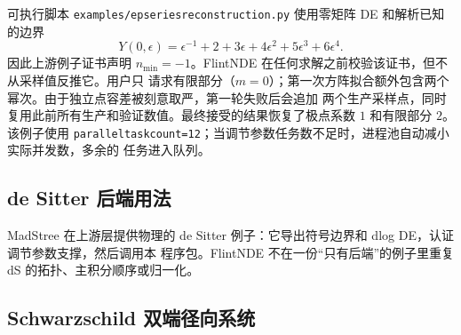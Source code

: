 \documentclass[11pt,a4paper]{ctexart}
\renewcommand{\_}{\origunderscore\allowbreak}
\begin{document}
可执行脚本 \texttt{examples/ep\_series\_reconstruction.py} 使用零矩阵 DE 和解析已知的边界
\begin{equation}
 Y(0,\epsilon)=\epsilon^{-1}+2+3\epsilon+4\epsilon^2+5\epsilon^3+6\epsilon^4.
\end{equation}
因此上游例子证书声明 $n_{\min}=-1$。FlintNDE 在任何求解之前校验该证书，但不从采样值反推它。用户只
请求有限部分（$m=0$）；第一次方阵拟合额外包含两个幂次。由于独立点容差被刻意取严，第一轮失败后会追加
两个生产采样点，同时复用此前所有生产和验证数值。最终接受的结果恢复了极点系数 $1$ 和有限部分 $2$。
该例子使用 \texttt{parallel\_task\_count=12}；当调节参数任务数不足时，进程池自动减小实际并发数，多余的
任务进入队列。

\subsection{de Sitter 后端用法}

MadStree 在上游层提供物理的 de Sitter 例子：它导出符号边界和 dlog DE，认证调节参数支撑，然后调用本
程序包。FlintNDE 不在一份“只有后端”的例子里重复 dS 的拓扑、主积分顺序或归一化。

\subsection{Schwarzschild 双端径向系统}
\label{subsec:qnm-example}
\end{document}
